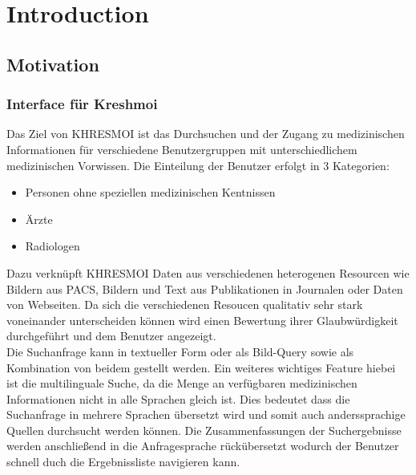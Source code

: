 \section{Introduction}
\label{sec:introduction}

\subsection{Motivation}
\label{sec:Motivation}

\subsubsection{Interface für Kreshmoi}
\label{sec:Interface für Kreshmoi}
Das Ziel von KHRESMOI ist das Durchsuchen und der Zugang zu medizinischen Informationen für verschiedene Benutzergruppen mit unterschiedlichem medizinischen Vorwissen.
Die Einteilung der Benutzer erfolgt in 3 Kategorien:
\begin{itemize}
	\item Personen ohne speziellen medizinischen Kentnissen
	\item Ärzte
	\item Radiologen
\end{itemize}
Dazu verknüpft KHRESMOI Daten aus verschiedenen heterogenen Resourcen wie Bildern aus PACS, Bildern und Text aus Publikationen in Journalen oder Daten von Webseiten.
Da sich die verschiedenen Resoucen qualitativ sehr stark voneinander unterscheiden können wird einen Bewertung ihrer Glaubwürdigkeit durchgeführt und dem Benutzer angezeigt.
\\
Die Suchanfrage kann in textueller Form oder als Bild-Query sowie als Kombination von beidem gestellt werden.
Ein weiteres wichtiges Feature hiebei ist die multilinguale Suche, da die Menge an verfügbaren medizinischen Informationen nicht in alle Sprachen gleich ist.
Dies bedeutet dass die Suchanfrage in mehrere Sprachen übersetzt wird und somit auch anderssprachige Quellen durchsucht werden können.
Die Zusammenfassungen der Suchergebnisse werden anschließend in die Anfragesprache rückübersetzt wodurch der Benutzer schnell duch die Ergebnissliste navigieren kann.

